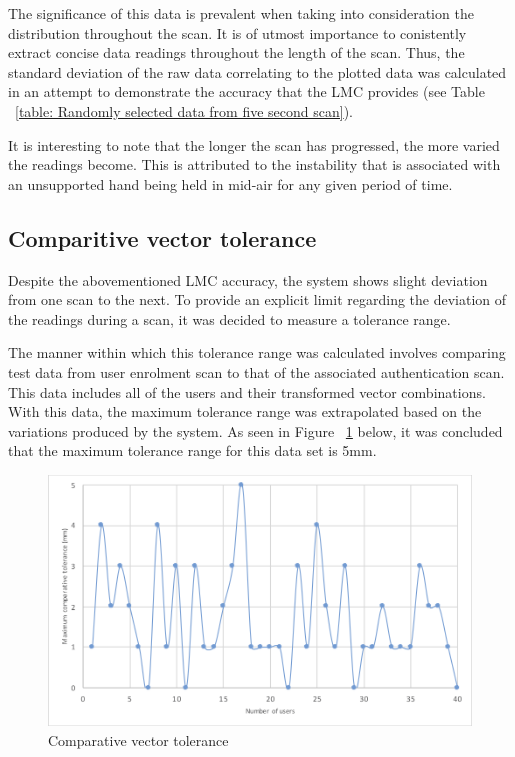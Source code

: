 The significance of this data is prevalent when taking into consideration the distribution throughout the scan. It is of utmost importance to conistently extract concise data readings throughout the length of the scan. Thus, the standard deviation of the raw data correlating to the plotted data was calculated in an attempt to demonstrate the accuracy that the LMC provides (see Table ~\ref{table: Randomly selected data from five second scan}).

It is interesting to note that the longer the scan has progressed, the more varied the readings become. This is attributed to the instability that is associated with an unsupported hand being held in mid-air for any given period of time.

\subsection{Comparitive vector tolerance}

Despite the abovementioned LMC accuracy, the system shows slight deviation from one scan to the next. To provide an explicit limit regarding the deviation of the readings during a scan, it was decided to measure a tolerance range.

The manner within which this tolerance range was calculated involves comparing test data from user enrolment scan to that of the associated authentication scan. This data includes all of the users and their transformed vector combinations. With this data, the maximum tolerance range was extrapolated based on the variations produced by the system. As seen in Figure ~\ref{fig:Comparative vector tolerance} below, it was concluded that the maximum tolerance range for this data set is 5mm.

    
    \begin{figure}[htbp!] 
    \centering    
    \includegraphics[width=1.0\textwidth]{Chapter4/Figs/Comparative.png}
    \caption[Comparative vector tolerance]{Comparative vector tolerance}
    \label{fig:Comparative vector tolerance}
    \end{figure}

